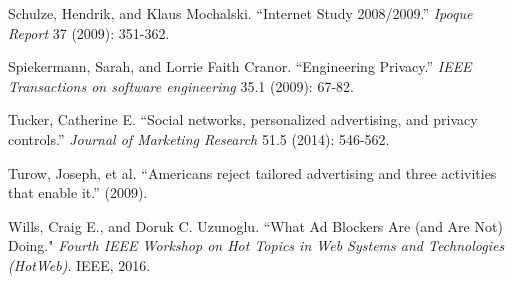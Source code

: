 \documentclass[conference]{IEEEtran}
\begin{document}
\begin{thebibliography}{99}
 Schulze, Hendrik, and Klaus Mochalski. “Internet Study 2008/2009.” \textit{Ipoque Report} 37 (2009): 351-362.

 Spiekermann, Sarah, and Lorrie Faith Cranor. “Engineering Privacy.” \textit{IEEE Transactions on software engineering} 35.1 (2009): 67-82.

 Tucker, Catherine E. “Social networks, personalized advertising, and privacy controls.” \textit{Journal of Marketing Research} 51.5 (2014): 546-562.

 Turow, Joseph, et al. “Americans reject tailored advertising and three activities that enable it.” (2009).

 Wills, Craig E., and Doruk C. Uzunoglu. “What Ad Blockers Are (and Are Not) Doing." \textit{Fourth IEEE Workshop on Hot Topics in Web Systems and Technologies (HotWeb)}. IEEE, 2016.


\end{thebibliography}
\end{document}

